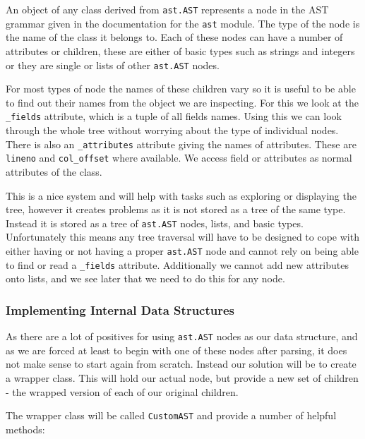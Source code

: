 \documentclass{report}
\begin{document}
An object of any class derived from \texttt{ast.AST} represents a node in the AST grammar given in the documentation for the \texttt{ast} module. The
type of the node is the name of the class it belongs to. Each of these nodes can have a number of attributes or children, these are either of basic
types such as strings and integers or they are single or lists of other \texttt{ast.AST} nodes.

For most types of node the names of these children vary so it is useful to be able to find out their names from the object we are inspecting. For this we
look at the \texttt{\_fields} attribute, which is a tuple of all fields names. Using this we can look through the whole tree without worrying about the type
of individual nodes. There is also an \texttt{\_attributes} attribute giving the names of attributes. These are \texttt{lineno} and \texttt{col\_offset} where
available. We access field or attributes as normal attributes of the class.

This is a nice system and will help with tasks such as exploring or displaying the tree, however it creates problems as it is not stored as a tree of the same
type. Instead it is stored as a tree of \texttt{ast.AST} nodes, lists, and basic types. Unfortunately this means any tree traversal will have to be designed to
cope with either having or not having a proper \texttt{ast.AST} node and cannot rely on being able to find or read a \texttt{\_fields} attribute. Additionally we
cannot add new attributes onto lists, and we see later that we need to do this for any node.

\subsubsection{Implementing Internal Data Structures}

As there are a lot of positives for using \texttt{ast.AST} nodes as our data structure, and as we are forced at least to begin with one of these nodes after parsing,
it does not make sense to start again from scratch. Instead our solution will be to create a wrapper class. This will hold our actual node, but provide a new set of
children - the wrapped version of each of our original children.

The wrapper class will be called \texttt{CustomAST} and provide a number of helpful methods:
\end{document}
